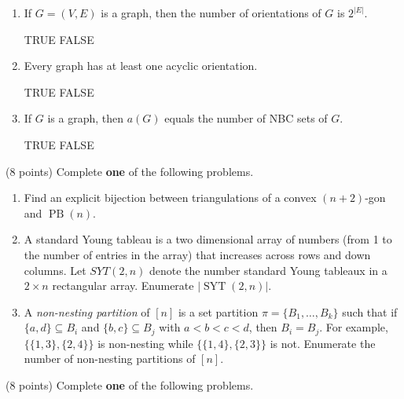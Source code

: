 \documentclass[11pt]{article}
\theoremstyle{definition}
\DeclareMathOperator{\SYT}{SYT}
\DeclareMathOperator{\PB}{PB}
\begin{document}
\begin{enumerate}
\begin{enumerate}
\item If $G=(V,E)$ is a graph, then the number of orientations of $G$ is $2^{|E|}$.

\smallskip

TRUE \qquad FALSE

\item Every graph has at least one acyclic orientation.

\smallskip

TRUE \qquad FALSE

\item If $G$ is a graph, then $a(G)$ equals the number of NBC sets of $G$.

\smallskip

TRUE \qquad FALSE

\end{enumerate}

(8 points) Complete \textbf{one} of the following problems.

\begin{enumerate}

\item Find an explicit bijection between triangulations of a convex $(n+2)$-gon and $\PB(n)$.


\item A standard Young tableau is a two dimensional array of numbers (from 1 to the number of entries in the array) that increases across rows and down columns. Let $SYT(2, n)$ denote the number standard Young tableaux in a $2\times n$ rectangular array. Enumerate $|\SYT(2,n)|$.

\item A \emph{non-nesting partition} of $[n]$ is a set partition $\pi=\{B_1,\ldots,B_k\}$ such that if $\{a,d\}\subseteq B_i$ and $\{b,c\}\subseteq B_j$ with $a<b<c<d$, then $B_i=B_j$.  For example, $\{\{1,3\},\{2,4\}\}$ is non-nesting while $\{\{1,4\},\{2,3\}\}$ is not.  Enumerate the number of non-nesting partitions of $[n]$.

\end{enumerate}

(8 points) Complete \textbf{one} of the following problems.


\end{enumerate}
\end{document}
